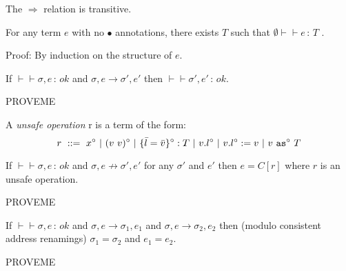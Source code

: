 \documentclass{article}
\newcommand{\safe}{\bullet}
\newcommand{\unsafe}{\circ}
\newcommand{\app}[3]{(#2~#3)^{#1}}
\newcommand{\cast}[3]{#2~\t{as}^{#1}~#3}
\renewcommand{\t}[1]{{\tt #1}}
\newcommand{\Implies}[0]{\Rightarrow}
\newcommand{\red}[0]{\longrightarrow}  %
\newcommand{\lred}[0]{\red}  %
\newcommand{\judges}[3]{#1\vdash\!\!\!\vdash #2\,:\,#3}
\newcommand{\obje}[3]{\{#2\}^{#1}:{#3}}
\newcommand{\objget}[3]{#2.#3^{#1}}
\newcommand{\objset}[4]{#2.#3^{#1}:=#4}
\begin{document}
\begin{lemma}
The $\Implies$ relation is transitive. 
\end{lemma}


\begin{lemma}[No Failure]
For any term $e$ with no $\safe$ annotations, there exists $T$ such that
$\judges{\emptyset}{e}{T}$ .
\end{lemma}
Proof: By induction on the structure of $e$.

\begin{lemma}[Preservation]
If $\judges{}{\sigma,e}{ok}$ and $\sigma,e\lred \sigma',e'$ then $\judges{}{\sigma',e'}{ok}$.
\end{lemma}
PROVEME

A \emph{unsafe operation} r is a term of the form:
\[
	r ~::=~ x^\unsafe ~|~ \app{\unsafe}{v}{v} ~|~ \obje{\unsafe}{\bar l = \bar v}{T} ~|~ \objget{\unsafe}{v}{l} ~|~ \objset{\unsafe} v l v
	~|~ \cast{\unsafe} v T
\]
 
\begin{lemma}[Progress]
If $\judges{}{\sigma,e}{ok}$ and $\sigma,e\not\lred \sigma',e'$
for any $\sigma'$ and $e'$ then $e=C[r]$ where $r$ is an unsafe operation. 
\end{lemma}
PROVEME

\begin{lemma}[Determinism]
If $\judges{}{\sigma,e}{ok}$ and $\sigma,e\lred \sigma_1,e_1$ and $\sigma,e\lred \sigma_2,e_2$ then (modulo consistent address renamings) $\sigma_1=\sigma_2$ and $e_1=e_2$.
\end{lemma}
PROVEME
\end{document}

